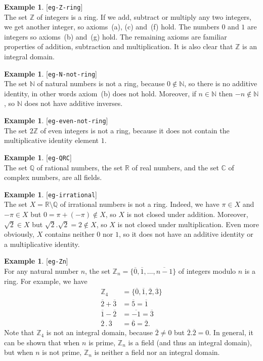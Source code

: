 \documentclass{amsart}
\newcommand{\lbl}[1]{\label{#1}\textup{[\texttt{#1}]}\ \\}
\newcommand{\lbl}{\label}
\newcommand{\C}         {{\mathbb{C}}}
\newcommand{\N}         {{\mathbb{N}}}
\newcommand{\Q}         {{\mathbb{Q}}}
\newcommand{\R}         {{\mathbb{R}}}
\newcommand{\Z}         {{\mathbb{Z}}}
\newcommand{\ov}[1]     {\overline{#1}}
\newcommand{\sm}        {\setminus}
\renewcommand{\:}{\colon}
\theoremstyle{definition}
\newtheorem{example}[theorem]{Example}
\begin{document}
\begin{example}\lbl{eg-Z-ring}
 The set $\Z$ of integers is a ring.  If we add, subtract or multiply
 any two integers, we get another integer, so axioms~(a), (c) and~(f)
 hold.  The numbers $0$ and $1$ are integers so axioms~(b) and~(g)
 hold.  The remaining axioms are familiar properties of addition,
 subtraction and multiplication.  It is also clear that $\Z$ is an
 integral domain.
\end{example}
\begin{example}\lbl{eg-N-not-ring}
 The set $\N$ of natural numbers is not a ring, because $0\not\in\N$,
 so there is no additive identity, in other words axiom~(b) does not
 hold.  Moreover, if $n\in\N$ then $-n\not\in\N$, so $\N$ does not
 have additive inverses.
\end{example}
\begin{example}\lbl{eg-even-not-ring}
 The set $2\Z$ of even integers is not a ring, because it does not
 contain the multiplicative identity element $1$.
\end{example}
\begin{example}\lbl{eg-QRC}
 The set $\Q$ of rational numbers, the set $\R$ of real numbers, and
 the set $\C$ of complex numbers, are all fields.
\end{example}
\begin{example}\lbl{eg-irrational}
 The set $X=\R\sm\Q$ of irrational numbers is not a ring.  Indeed, we
 have $\pi\in X$ and $-\pi\in X$ but $0=\pi+(-\pi)\not\in X$, so $X$
 is not closed under addition.  Moreover, $\sqrt{2}\in X$ but
 $\sqrt{2}.\sqrt{2}=2\not\in X$, so $X$ is not closed under
 multiplication.  Even more obviously, $X$ contains neither $0$ nor
 $1$, so it does not have an additive identity or a multiplicative
 identity.
\end{example}
\begin{example}\lbl{eg-Zn}
 For any natural number $n$, the set
 $\Z_n=\{\ov{0},\ov{1},\ldots,\ov{n-1}\}$ of integers modulo $n$ is a
 ring.  For example, we have
 \begin{align*}
  \Z_4 &= \{\ov{0},\ov{1},\ov{2},\ov{3}\}  \\
  \ov{2} + \ov{3} &= \ov{5} = \ov{1} \\
  \ov{1} - \ov{2} &= \ov{-1} = \ov{3} \\
  \ov{2} \,.\, \ov{3} &= \ov{6} = \ov{2}.  
 \end{align*}
 Note that $\Z_4$ is not an integral domain, because $\ov{2}\neq 0$
 but $\ov{2}.\ov{2}=0$.  In general, it can be shown that when $n$ is
 prime, $\Z_n$ is a field (and thus an integral domain), but when $n$
 is not prime, $\Z_n$ is neither a field nor an integral domain.
\end{example}
\end{document}
